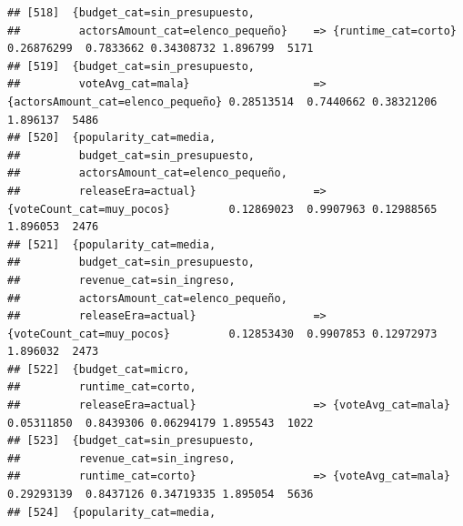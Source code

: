\documentclass[
]{article}
\begin{document}
\begin{verbatim}
## [518]  {budget_cat=sin_presupuesto,                                                                                             
##         actorsAmount_cat=elenco_pequeño}    => {runtime_cat=corto}               0.26876299  0.7833662 0.34308732 1.896799  5171
## [519]  {budget_cat=sin_presupuesto,                                                                                             
##         voteAvg_cat=mala}                   => {actorsAmount_cat=elenco_pequeño} 0.28513514  0.7440662 0.38321206 1.896137  5486
## [520]  {popularity_cat=media,                                                                                                   
##         budget_cat=sin_presupuesto,                                                                                             
##         actorsAmount_cat=elenco_pequeño,                                                                                        
##         releaseEra=actual}                  => {voteCount_cat=muy_pocos}         0.12869023  0.9907963 0.12988565 1.896053  2476
## [521]  {popularity_cat=media,                                                                                                   
##         budget_cat=sin_presupuesto,                                                                                             
##         revenue_cat=sin_ingreso,                                                                                                
##         actorsAmount_cat=elenco_pequeño,                                                                                        
##         releaseEra=actual}                  => {voteCount_cat=muy_pocos}         0.12853430  0.9907853 0.12972973 1.896032  2473
## [522]  {budget_cat=micro,                                                                                                       
##         runtime_cat=corto,                                                                                                      
##         releaseEra=actual}                  => {voteAvg_cat=mala}                0.05311850  0.8439306 0.06294179 1.895543  1022
## [523]  {budget_cat=sin_presupuesto,                                                                                             
##         revenue_cat=sin_ingreso,                                                                                                
##         runtime_cat=corto}                  => {voteAvg_cat=mala}                0.29293139  0.8437126 0.34719335 1.895054  5636
## [524]  {popularity_cat=media,                                                                                                   

\end{verbatim}
\end{document}
